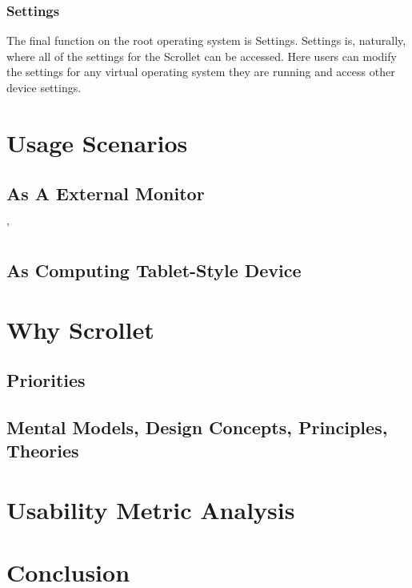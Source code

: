 \documentclass[a4paper]{article}
\begin{document}
\subsubsection{Settings}
The final function on the root operating system is Settings. Settings is, naturally, where all of the settings for the Scrollet can be accessed. Here users can modify the settings for any virtual operating system they are running and access other device settings.




\section{Usage Scenarios}
\subsection{As A External Monitor}
'

\subsection{As Computing Tablet-Style Device}

\section{Why Scrollet}

\subsection{Priorities}
\subsection{Mental Models, Design Concepts, Principles, Theories}

\section{Usability Metric Analysis}

\section{Conclusion}
\end{document}
